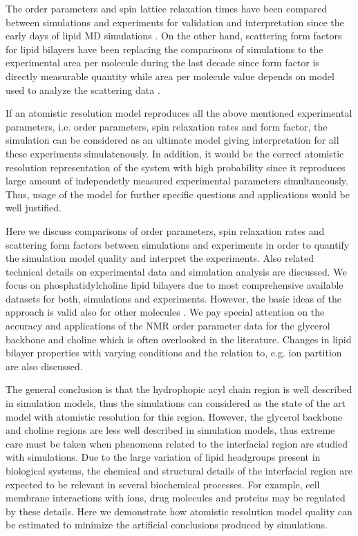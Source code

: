 \documentclass[aps,prl,superscriptaddress,twocolumn]{revtex4}
\begin{document}
The order parameters and spin lattice relaxation times have been compared between simulations
and experiments for validation and interpretation since the early days of lipid MD simulations \cite{ploeg82,pastor88}.
On the other hand, scattering form factors for lipid bilayers have been replacing the 
comparisons of simulations to the experimental area per molecule during the last decade
since form factor is directly measurable quantity while area per molecule value depends on
model used to analyze the scattering data \cite{nagle00}.

If an atomistic resolution model reproduces all the above mentioned experimental parameters,
i.e. order parameters, spin relaxation rates and form factor, the simulation can be considered
as an ultimate model giving interpretation for all these experiments simulatenously.
In addition, it would be the correct atomistic resolution representation of the system with high
probability since it reproduces large amount of independetly measured experimental parameters 
simultaneously. Thus, usage of the model for further specific questions and applications would be well justified.

Here we discuss comparisons of order parameters, spin relaxation rates
and scattering form factors between simulations and experiments in order to quantify the 
simulation model quality and interpret the experiments. Also related technical details on experimental
data and simulation analysis are discussed. We focus on phosphatidylcholine lipid
bilayers due to most comprehensive available datasets for both, simulations and experiments.
However, the basic ideas of the approach is valid also for other molecules \cite{wohlgemuth80,kapla12,pan12,kucerka12,nowacka13,pan14,boscia14,ferreira14}. 
We pay special attention on the accuracy and applications of the NMR order parameter data 
for the glycerol backbone and choline which is often overlooked in the literature.
Changes in lipid bilayer properties with varying conditions and the relation
to, e.g. ion partition are also discussed.

 
The general conclusion is that the hydrophopic acyl chain region is well described
in simulation models, thus the simulations can considered as the state of the art model
with atomistic resolution for this region. However, the glycerol backbone and choline regions are 
less well described in simulation models, thus extreme care must be taken when phenomena
related to the interfacial region are studied with simulations. Due to the large variation of lipid 
headgroups present in biological systems, the chemical and structural details of the interfacial
region are expected to be relevant in several biochemical processes. For example, 
cell membrane interactions with ions, drug molecules and proteins may be regulated by these
details. Here we demonstrate how atomistic resolution model quality can be estimated to minimize 
the artificial conclusions produced by simulations.
\end{document}
